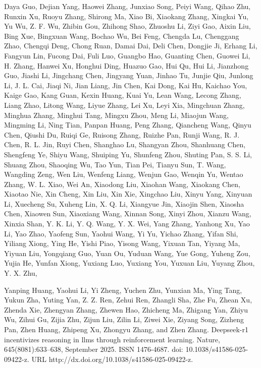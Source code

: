 \documentclass[
  10
]{article}
\begin{document}
Daya Guo, Dejian Yang, Haowei Zhang, Junxiao Song, Peiyi Wang, Qihao
Zhu, Runxin Xu, Ruoyu Zhang, Shirong Ma, Xiao Bi, Xiaokang Zhang,
Xingkai Yu, Yu Wu, Z. F. Wu, Zhibin Gou, Zhihong Shao, Zhuoshu Li, Ziyi
Gao, Aixin Liu, Bing Xue, Bingxuan Wang, Bochao Wu, Bei Feng, Chengda
Lu, Chenggang Zhao, Chengqi Deng, Chong Ruan, Damai Dai, Deli Chen,
Dongjie Ji, Erhang Li, Fangyun Lin, Fucong Dai, Fuli Luo, Guangbo Hao,
Guanting Chen, Guowei Li, H. Zhang, Hanwei Xu, Honghui Ding, Huazuo Gao,
Hui Qu, Hui Li, Jianzhong Guo, Jiashi Li, Jingchang Chen, Jingyang Yuan,
Jinhao Tu, Junjie Qiu, Junlong Li, J. L. Cai, Jiaqi Ni, Jian Liang, Jin
Chen, Kai Dong, Kai Hu, Kaichao You, Kaige Gao, Kang Guan, Kexin Huang,
Kuai Yu, Lean Wang, Lecong Zhang, Liang Zhao, Litong Wang, Liyue Zhang,
Lei Xu, Leyi Xia, Mingchuan Zhang, Minghua Zhang, Minghui Tang, Mingxu
Zhou, Meng Li, Miaojun Wang, Mingming Li, Ning Tian, Panpan Huang, Peng
Zhang, Qiancheng Wang, Qinyu Chen, Qiushi Du, Ruiqi Ge, Ruisong Zhang,
Ruizhe Pan, Runji Wang, R. J. Chen, R. L. Jin, Ruyi Chen, Shanghao Lu,
Shangyan Zhou, Shanhuang Chen, Shengfeng Ye, Shiyu Wang, Shuiping Yu,
Shunfeng Zhou, Shuting Pan, S. S. Li, Shuang Zhou, Shaoqing Wu, Tao Yun,
Tian Pei, Tianyu Sun, T. Wang, Wangding Zeng, Wen Liu, Wenfeng Liang,
Wenjun Gao, Wenqin Yu, Wentao Zhang, W. L. Xiao, Wei An, Xiaodong Liu,
Xiaohan Wang, Xiaokang Chen, Xiaotao Nie, Xin Cheng, Xin Liu, Xin Xie,
Xingchao Liu, Xinyu Yang, Xinyuan Li, Xuecheng Su, Xuheng Lin, X. Q. Li,
Xiangyue Jin, Xiaojin Shen, Xiaosha Chen, Xiaowen Sun, Xiaoxiang Wang,
Xinnan Song, Xinyi Zhou, Xianzu Wang, Xinxia Shan, Y. K. Li, Y. Q. Wang,
Y. X. Wei, Yang Zhang, Yanhong Xu, Yao Li, Yao Zhao, Yaofeng Sun, Yaohui
Wang, Yi Yu, Yichao Zhang, Yifan Shi, Yiliang Xiong, Ying He, Yishi
Piao, Yisong Wang, Yixuan Tan, Yiyang Ma, Yiyuan Liu, Yongqiang Guo,
Yuan Ou, Yuduan Wang, Yue Gong, Yuheng Zou, Yujia He, Yunfan Xiong,
Yuxiang Luo, Yuxiang You, Yuxuan Liu, Yuyang Zhou, Y. X. Zhu,



Yanping Huang, Yaohui Li, Yi Zheng, Yuchen Zhu, Yunxian Ma, Ying Tang,
Yukun Zha, Yuting Yan, Z. Z. Ren, Zehui Ren, Zhangli Sha, Zhe Fu, Zhean
Xu, Zhenda Xie, Zhengyan Zhang, Zhewen Hao, Zhicheng Ma, Zhigang Yan,
Zhiyu Wu, Zihui Gu, Zijia Zhu, Zijun Liu, Zilin Li, Ziwei Xie, Ziyang
Song, Zizheng Pan, Zhen Huang, Zhipeng Xu, Zhongyu Zhang, and Zhen
Zhang. Deepseek-r1 incentivizes reasoning in llms through reinforcement
learning. Nature, 645(8081):633--638, September 2025. ISSN 1476-4687.
doi: 10.1038/s41586-025-09422-z. URL
http://dx.doi.org/10.1038/s41586-025-09422-z.
\end{document}
